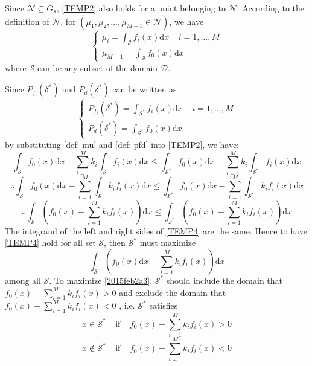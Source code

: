 Since $\mathcal{N} \subseteq G_s$, \eqref{TEMP2} also holds for a point belonging to $\mathcal{N}$.
According to the definition of $\mathcal{N}$, for $(\mu_1, \mu_2, ..., \mu_{M+1} \in \mathcal{N})$, we have  
\begin{equation}
\label{def: mu}
\begin{cases}
\mu_i = \int_{\mathcal{S}}f_i(x)\mathrm{d}x \;\;\;\;i = 1, ..., M\\
\mu_{M+1} = \int_{\mathcal{S}}f_{0}(x)\mathrm{d}x
\end{cases}
\end{equation}
where $\mathcal{S}$ can be any subset of the domain $\mathcal{D}$. 

Since $P_{f_i}(\delta^\ast)$ and $P_{d}(\delta^\ast)$ can be written as
\begin{equation}
\label{def: pfd}
\begin{cases}
P_{f_i}(\delta^\ast) = \int_{\mathcal{S}^\ast}f_i(x)\mathrm{d}x\;\;\;\;i=1, ..., M\\
P_d(\delta^\ast) = \int_{\mathcal{S}^\ast}f_0(x)\mathrm{d}x
\end{cases}
\end{equation}
by substituting \eqref{def: mu} and \eqref{def: pfd} into \eqref{TEMP2}, we have: 
\[
\int_{\mathcal{S}}f_{0}(x)\mathrm{d}x - \sum_{i=1}^{M}k_i\int_{\mathcal{S}}f_i(x)\mathrm{d}x \leq \int_{\mathcal{S}^\ast}f_{0}(x)\mathrm{d}x - \sum_{i=1}^{M}k_i\int_{\mathcal{S}^\ast}f_i(x)\mathrm{d}x
\]
\[
\therefore 
\int_{\mathcal{S}}f_{0}(x)\mathrm{d}x - \sum_{i=1}^{M}\int_{\mathcal{S}}k_if_i(x)\mathrm{d}x \leq \int_{\mathcal{S}^\ast}f_{0}(x)\mathrm{d}x - \sum_{i=1}^{M}\int_{\mathcal{S}^\ast}k_if_i(x)\mathrm{d}x
\]
\begin{equation}
\label{TEMP4}
\therefore \int_{\mathcal{S}}(f_{0}(x)- \sum_{i=1}^{M}k_if_{i}(x))\mathrm{d}x \leq \int_{\mathcal{S}^\ast}(f_{0}(x)- \sum_{i=1}^{M}k_if_{i}(x))\mathrm{d}x 
\end{equation}
The integrand of the left  and right sides of \eqref{TEMP4} are the same. Hence to have  \eqref{TEMP4} hold for all set $\mathcal{S}$,  
then  $\mathcal{S}^\ast$ must  maximize 
\begin{equation}
\int_{\mathcal{S}}(f_{0}(x)\mathrm{d}x - \sum_{i=1}^{M}k_if_i(x))\mathrm{d}x
  \label{2015feb2a3}
\end{equation}
among all $\mathcal{S}$. To maximize \eqref{2015feb2a3}, $\mathcal{S}^\ast$ should include the domain that $f_{0}(x)- \sum_{i=1}^{M}k_if_{i}(x) > 0$ and exclude the domain that $f_{0}(x)- \sum_{i=1}^{M}k_if_{i}(x) < 0$ \cite{LehmannTest}, i.e.   
 $\mathcal{S}^\ast$ satisfies
\[
x \in \mathcal{S}^\ast\;\;\;\;\text{if}\;\;\;\;f_{0}(x)- \sum_{i=1}^{M}k_if_{i}(x) > 0
\]
\[
x \notin \mathcal{S}^\ast\;\;\;\;\text{if}\;\;\;\;f_{0}(x)- \sum_{i=1}^{M}k_if_{i}(x) < 0
\]

